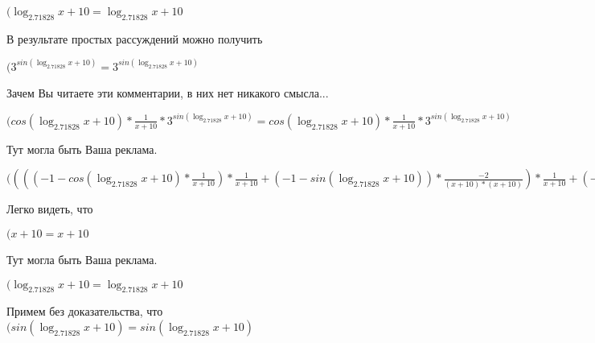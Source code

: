 \documentclass[12pt,a4paper,fleqn]{article}
\theoremstyle{definition}
\begin{document}
$(\log_{ 2.71828 }{ x  +  10 } = \log_{ 2.71828 }{ x  +  10 }$

В результате простых рассуждений можно получить

$({ 3 }^{sin(\log_{ 2.71828 }{ x  +  10 })} = { 3 }^{sin(\log_{ 2.71828 }{ x  +  10 })}$

Зачем Вы читаете эти комментарии, в них нет никакого смысла...

$(cos(\log_{ 2.71828 }{ x  +  10 }) * \frac{ 1 }{ x  +  10 }
 * { 3 }^{sin(\log_{ 2.71828 }{ x  +  10 })} = cos(\log_{ 2.71828 }{ x  +  10 }) * \frac{ 1 }{ x  +  10 }
 * { 3 }^{sin(\log_{ 2.71828 }{ x  +  10 })}$

Тут могла быть Ваша реклама.

$(((( -1  - cos(\log_{ 2.71828 }{ x  +  10 }) * \frac{ 1 }{ x  +  10 }
) * \frac{ 1 }{ x  +  10 }
 + ( -1  - sin(\log_{ 2.71828 }{ x  +  10 })) * \frac{ -2 }{( x  +  10 ) * ( x  +  10 )}
) * \frac{ 1 }{ x  +  10 }
 + ( -1  - sin(\log_{ 2.71828 }{ x  +  10 })) * \frac{ 1 }{ x  +  10 }
 * \frac{ -2 }{( x  +  10 ) * ( x  +  10 )}
 + ( -1  - sin(\log_{ 2.71828 }{ x  +  10 })) * \frac{ 1 }{ x  +  10 }
 * \frac{ -2 }{( x  +  10 ) * ( x  +  10 )}
 + cos(\log_{ 2.71828 }{ x  +  10 }) * \frac{ -1  -  -2  * ( x  +  10  +  x  +  10 )}{( x  +  10 ) * ( x  +  10 ) * ( x  +  10 ) * ( x  +  10 )}
) * cos(\log_{ 2.71828 }{ x  +  10 }) * \frac{ 1 }{ x  +  10 }
 * { 3 }^{sin(\log_{ 2.71828 }{ x  +  10 })} = ((( -1  - cos(\log_{ 2.71828 }{ x  +  10 }) * \frac{ 1 }{ x  +  10 }
) * \frac{ 1 }{ x  +  10 }
 + ( -1  - sin(\log_{ 2.71828 }{ x  +  10 })) * \frac{ -2 }{( x  +  10 ) * ( x  +  10 )}
) * \frac{ 1 }{ x  +  10 }
 + ( -1  - sin(\log_{ 2.71828 }{ x  +  10 })) * \frac{ 1 }{ x  +  10 }
 * \frac{ -2 }{( x  +  10 ) * ( x  +  10 )}
 + ( -1  - sin(\log_{ 2.71828 }{ x  +  10 })) * \frac{ 1 }{ x  +  10 }
 * \frac{ -2 }{( x  +  10 ) * ( x  +  10 )}
 + cos(\log_{ 2.71828 }{ x  +  10 }) * \frac{ -1  -  -2  * ( x  +  10  +  x  +  10 )}{( x  +  10 ) * ( x  +  10 ) * ( x  +  10 ) * ( x  +  10 )}
) * cos(\log_{ 2.71828 }{ x  +  10 }) * \frac{ 1 }{ x  +  10 }
 * { 3 }^{sin(\log_{ 2.71828 }{ x  +  10 })}$

Легко видеть, что

$( x  +  10  =  x  +  10 $

Тут могла быть Ваша реклама.

$(\log_{ 2.71828 }{ x  +  10 } = \log_{ 2.71828 }{ x  +  10 }$

Примем без доказательства, что
$(sin(\log_{ 2.71828 }{ x  +  10 }) = sin(\log_{ 2.71828 }{ x  +  10 })$
\end{document}
